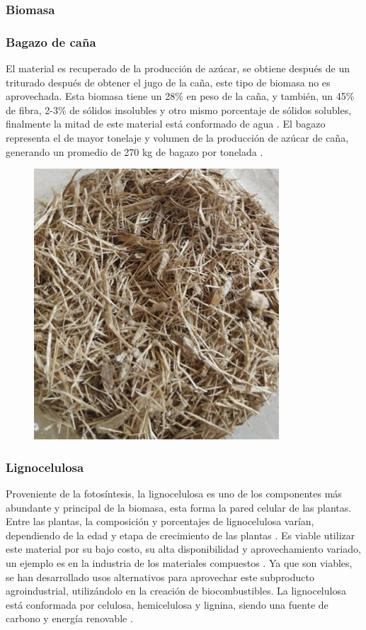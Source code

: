 \documentclass[12pt]{article}
\begin{document}
		\subsubsection{Biomasa}
		
		\subsubsection{Bagazo de caña}
		El material es recuperado de la producción de azúcar, se obtiene después de un triturado después de obtener el jugo de la caña, este tipo de biomasa no es aprovechada. Esta biomasa tiene un 28\% en peso de la caña, y también, un 45\% de fibra, 2-3\% de sólidos insolubles y otro mismo porcentaje de sólidos solubles, finalmente la mitad de este material está conformado de agua \cite{olmo2015bagazo}.
		El bagazo representa el de mayor tonelaje y volumen de la producción de azúcar de caña, generando un promedio de 270 kg de bagazo por tonelada \cite{perez2022efecto}.
		
		\begin{figure}[h]
			\centering
			\includegraphics[width=0.4\linewidth]{imagenes/bagazo}
			\caption[Bagazo de caña]{}
			\label{fig:bagazo}
		\end{figure}
		
		\subsubsection{Lignocelulosa}
		
		Proveniente de la fotosíntesis, la lignocelulosa es uno de los componentes más abundante y principal de la biomasa, esta forma la pared celular de las plantas. Entre las plantas, la composición y porcentajes de lignocelulosa varían, dependiendo de la edad y etapa de crecimiento de las plantas \cite{cuervo2009lignocelulosa}.
		Es viable utilizar este material por su bajo costo, su alta disponibilidad y aprovechamiento variado, un ejemplo es en la industria de los materiales compuestos \cite{jara2022principales}.
		Ya que son viables, se han desarrollado usos alternativos para aprovechar este subproducto agroindustrial, utilizándolo en la creación de biocombustibles.
		La lignocelulosa está conformada por celulosa, hemicelulosa y lignina, siendo una fuente de carbono y energía renovable \cite{portalproduccon}. 
		
\end{document}
